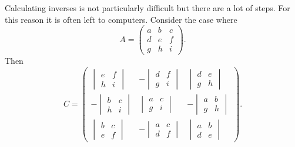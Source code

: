 \documentclass[a4paper]{article}
\begin{document}
    Calculating inverses is not particularly difficult but there are a lot of steps.
    For this reason it is often left to computers.
    Consider the case where
    \[
        A = 
        \begin{pmatrix}
            a & b & c\\
            d & e & f\\
            g & h & i
        \end{pmatrix}
        .
    \]
    Then
    \[
        C = 
        \begin{pmatrix}
            \begin{vmatrix}
                e & f\\
                h & i
            \end{vmatrix}
            & -
            \begin{vmatrix}
                d & f\\
                g & i
            \end{vmatrix}
            &
            \begin{vmatrix}
                d & e\\
                g & h
            \end{vmatrix}
            \\
            -
            \begin{vmatrix}
                b & c\\
                h & i
            \end{vmatrix}
            &
            \begin{vmatrix}
                a & c\\
                g & i
            \end{vmatrix}
            &
            -
            \begin{vmatrix}
                a & b\\
                g & h
            \end{vmatrix}
            \\
            \begin{vmatrix}
                b & c\\
                e & f
            \end{vmatrix}
            &
            -
            \begin{vmatrix}
                a & c\\
                d & f
            \end{vmatrix}
            &
            \begin{vmatrix}
                a & b\\
                d & e
            \end{vmatrix}
        \end{pmatrix}
        .
    \]
\end{document}
